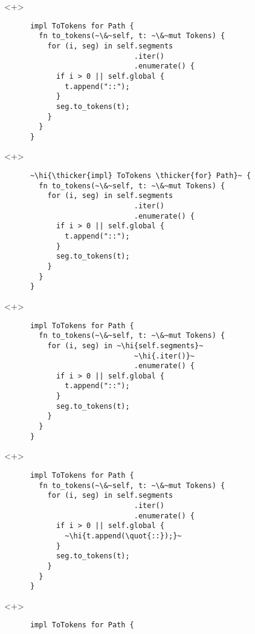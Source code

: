 \documentclass[usepdftitle=false]{beamer}
\renewcommand{\&}{\makebox[\widthof{\ampersand}][c]{\scalebox{0.9}[1.0]{\Book\ampersand}}}
\newcommand{\+}{\makebox[\widthof{+}][c]{\raisebox{-.2\height}{\scalefont{1.5}\Light+}}}
\newcommand{\thicker}[1]{\contourlength{0.26pt}\contour[10]{black}{#1}}
\newcommand{\hi}[1]{%
\tikz[baseline=(A.base)]
 \node[highlighting=0,inner sep=0pt,text depth=0pt] (A) {#1};%
}
\newcommand{\quot}[1]{''#1''}
\begin{document}
\begin{frame}[fragile]
  \begin{onlyenv}<+>
    \begin{verbatim}
      impl ToTokens for Path {
        fn to_tokens(~\&~self, t: ~\&~mut Tokens) {
          for (i, seg) in self.segments
                              .iter()
                              .enumerate() {
            if i > 0 || self.global {
              t.append("::");
            }
            seg.to_tokens(t);
          }
        }
      }
    \end{verbatim}
  \end{onlyenv}
  \begin{onlyenv}<+>
    \begin{verbatim}
      ~\hi{\thicker{impl} ToTokens \thicker{for} Path}~ {
        fn to_tokens(~\&~self, t: ~\&~mut Tokens) {
          for (i, seg) in self.segments
                              .iter()
                              .enumerate() {
            if i > 0 || self.global {
              t.append("::");
            }
            seg.to_tokens(t);
          }
        }
      }
    \end{verbatim}
  \end{onlyenv}
  \begin{onlyenv}<+>
    \begin{verbatim}
      impl ToTokens for Path {
        fn to_tokens(~\&~self, t: ~\&~mut Tokens) {
          for (i, seg) in ~\hi{self.segments}~
                              ~\hi{.iter()}~
                              .enumerate() {
            if i > 0 || self.global {
              t.append("::");
            }
            seg.to_tokens(t);
          }
        }
      }
    \end{verbatim}
  \end{onlyenv}
  \begin{onlyenv}<+>
    \begin{verbatim}
      impl ToTokens for Path {
        fn to_tokens(~\&~self, t: ~\&~mut Tokens) {
          for (i, seg) in self.segments
                              .iter()
                              .enumerate() {
            if i > 0 || self.global {
              ~\hi{t.append(\quot{::});}~
            }
            seg.to_tokens(t);
          }
        }
      }
    \end{verbatim}
  \end{onlyenv}
  \begin{onlyenv}<+>
    \begin{verbatim}
      impl ToTokens for Path {

\end{verbatim}
\end{onlyenv}
\end{frame}
\end{document}

